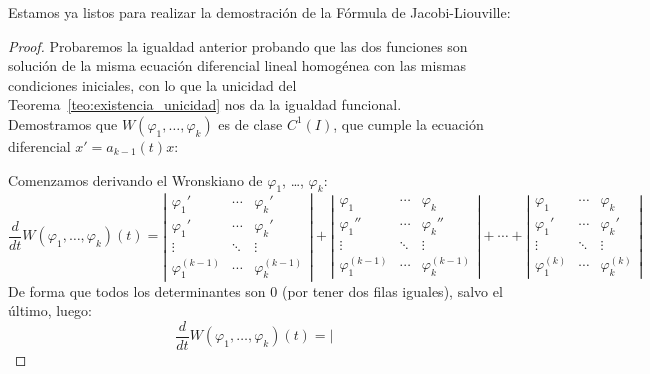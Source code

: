 \noindent
Estamos ya listos para realizar la demostración de la Fórmula de Jacobi-Liouville:
\begin{proof}
    Probaremos la igualdad anterior probando que las dos funciones son solución de la misma ecuación diferencial lineal homogénea con las mismas condiciones iniciales, con lo que la unicidad del Teorema~\ref{teo:existencia_unicidad} nos da la igualdad funcional.\\

    Demostramos que $W(\varphi_1,\ldots,\varphi_k)$ es de clase $C^1(I)$, que cumple la ecuación diferencial $x' = a_{k-1}(t) x$:

    Comenzamos derivando el Wronskiano de $\varphi_1$, \ldots, $\varphi_k$:
    \begin{equation*}
        \dfrac{d}{dt} W(\varphi_1,\ldots,\varphi_k)(t) = \left|\begin{array}{ccc}
            \varphi_1' & \cdots & \varphi_k' \\
            \varphi_1' & \cdots & \varphi_k' \\
            \vdots & \ddots & \vdots \\
            \varphi_1^{(k-1)} & \cdots & \varphi_k^{(k-1)} 
        \end{array}\right| + 
        \left|\begin{array}{ccc}
            \varphi_1 & \cdots & \varphi_k \\
            \varphi_1'' & \cdots & \varphi_k'' \\
            \vdots & \ddots & \vdots \\
            \varphi_1^{(k-1)} & \cdots & \varphi_k^{(k-1)} 
        \end{array}\right| + \cdots + 
        \left|\begin{array}{ccc}
            \varphi_1 & \cdots & \varphi_k \\
            \varphi_1' & \cdots & \varphi_k' \\
            \vdots & \ddots & \vdots \\
            \varphi_1^{(k)} & \cdots & \varphi_k^{(k)} 
        \end{array}\right| 
    \end{equation*}
    De forma que todos los determinantes son 0 (por tener dos filas iguales), salvo el último, luego:
    \begin{equation*}
        \dfrac{d}{dt}W(\varphi_1,\ldots,\varphi_k)(t) = 
        \left|\begin{array}{ccc}

\end{array}
\end{equation*}
\end{proof}
